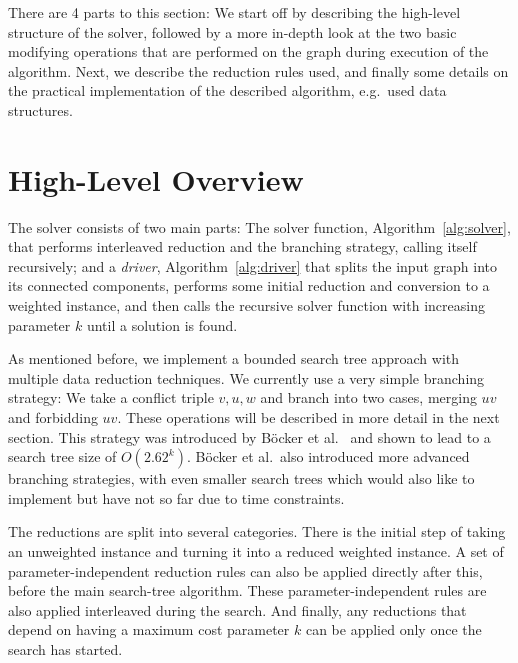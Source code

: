 \documentclass[12pt,oneside,english,parskip=full,headings=small]{scrbook}
\theoremstyle{definition}
\begin{document}
There are 4 parts to this section: We start off by describing the high-level structure of the
solver, followed by a more in-depth look at the two basic modifying operations that are performed on
the graph during execution of the algorithm. Next, we describe the reduction rules used, and finally
some details on the practical implementation of the described algorithm, e.g.\ used data structures.

\section{High-Level Overview}

The solver consists of two main parts: The solver function, Algorithm~\ref{alg:solver}, that
performs interleaved reduction and the branching strategy, calling itself recursively; and a
\emph{driver}, Algorithm~\ref{alg:driver} that splits the input graph into its connected components,
performs some initial reduction and conversion to a weighted instance, and then calls the recursive
solver function with increasing parameter $k$ until a solution is found. 

As mentioned before, we implement a bounded search tree approach with multiple data reduction
techniques. We currently use a very simple branching strategy: We take a conflict triple $v, u, w$
and branch into two cases, merging $uv$ and forbidding $uv$. These operations will be described in
more detail in the next section. This strategy was introduced by Böcker et al.~\cite{GoingWeighted}
and shown to lead to a search tree size of $O(2.62^k)$. Böcker et al.\ also introduced more advanced
branching strategies, with even smaller search trees which would also like to implement but have not
so far due to time constraints.

The reductions are split into several categories. There is the initial step of taking an
unweighted instance and turning it into a reduced weighted instance. A set of parameter-independent
reduction rules can also be applied directly after this, before the main search-tree algorithm.
These parameter-independent rules are also applied interleaved during the search. And finally, any
reductions that depend on having a maximum cost parameter $k$ can be applied only once the search
has started.
\end{document}
